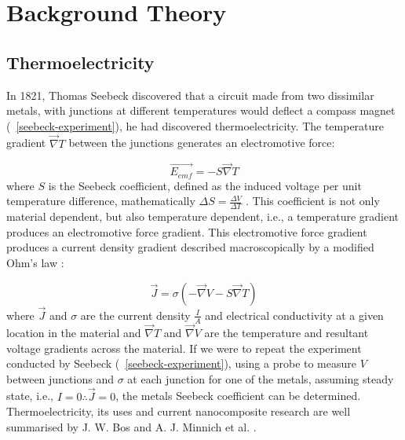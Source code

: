 \documentclass[a4paper,10pt,journal]{IEEEtran}
\newcommand{\figref}[2][\figurename~]{#1\ref{#2}}
\begin{document}
\section{Background Theory}

\subsection{Thermoelectricity}
In 1821, Thomas Seebeck discovered that a circuit made from two
dissimilar metals, with junctions at different temperatures would
deflect a compass magnet (\figref{seebeck-experiment}), he had
discovered thermoelectricity. The temperature gradient $\vec{\nabla}
T$ between the junctions generates an electromotive force:

\begin{equation}
\label{seebeck-emf}
	\vec{E_{emf}} = -S \vec{\nabla} T
\end{equation}
where $S$ is the Seebeck coefficient, defined as the induced voltage per
unit temperature difference, mathematically $\Delta S = \frac{\Delta
V}{\Delta T}$ \cite{auparay}. This coefficient is not only material
dependent, but also temperature dependent, i.e., a temperature gradient
produces an electromotive force gradient. This electromotive force
gradient produces a current density gradient described macroscopically
by a modified Ohm's law \cite{ziman}:

\begin{equation}
\label{current-density}
	\vec{J} = \sigma (-\vec{\nabla} V - S \vec{\nabla} T)
\end{equation}
where $\vec{J}$ and $\sigma$ are the current density $\frac{I}{A}$ and
electrical conductivity at a given location in the material and
$\vec{\nabla} T$ and $\vec{\nabla} V$ are the temperature and
resultant voltage gradients across the material. If we were to repeat the
experiment conducted by Seebeck (\figref{seebeck-experiment}), using a
probe to measure $V$ between junctions and $\sigma$ at each junction
for one of the metals, assuming steady state, i.e., $I=0 \therefore
\vec{J} = 0$, the metals Seebeck coefficient can be determined.\\
Thermoelectricity, its uses and current nanocomposite research are well
summarised by J. W. Bos \cite{bos-review} and A. J. Minnich et al.
\cite{minnich-review}.
\end{document}
